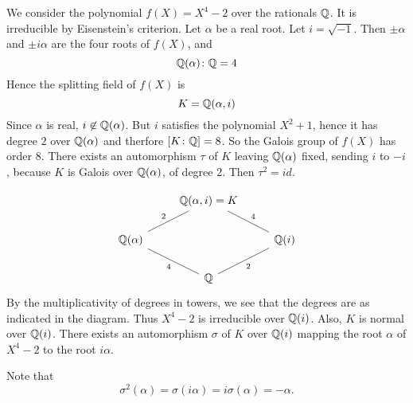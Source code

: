 \begin{example}[]
    We consider the polynomial $f(X) = X^4 - 2$ over the rationals  $\mathbb{Q}$. It is irreducible by Eisenstein's criterion. Let $\alpha$ be a real root. Let $i=\sqrt{-1}$. Then $\pm\alpha$ and $\pm i\alpha$ are the four roots of $f(X)$, and \[
    \mathbb{Q}(\alpha)\colon \mathbb{Q} = 4
\] 
Hence the splitting field of $f(X) $ is \[
    K=\mathbb{Q}(\alpha,i)
\]
Since $\alpha$ is real, $i\not\in\mathbb{Q}(\alpha)$. But $i$ satisfies the polynomial $X^2+1$, hence it has degree $2$ over  $\mathbb{Q}(\alpha)$ and therfore $[K\colon \mathbb{Q}] = 8$. So the Galois group of $f(X)$ has order $8$.
There exists an automorphism $\tau$ of $K$ leaving $\mathbb{Q}(\alpha)$ fixed, sending $i$ to $-i$, because $K$ is Galois over $\mathbb{Q}(\alpha)$, of degree 2.
Then $\tau^2 = id$.

\begin{equation*}
\begin{tikzcd}
   & \Q(\alpha,i) = K \ar[dr, dash, "4"]&\\
    \Q(\alpha) \arrow[ur, dash, "2"] &  & \Q(i) \ar[dl, dash, "2"]\\
    & \Q \ar[ul, dash, "4"]  &
\end{tikzcd}
\end{equation*}
By the multiplicativity of degrees in towers, we see that the degrees are as indicated in the diagram. 
Thus $X^4-2$ is irreducible over $\mathbb{Q}(i)$. Also, $K$ is normal over $\mathbb{Q}(i)$. There exists an automorphism $\sigma$ of $K$ over $\mathbb{Q}(i)$ mapping the root $\alpha$ of $X^4-2$ to the root $i\alpha$.

Note that \[
    \sigma^2(\alpha) = \sigma(i\alpha) = i\sigma(\alpha) = -\alpha
.\]


\end{example}
